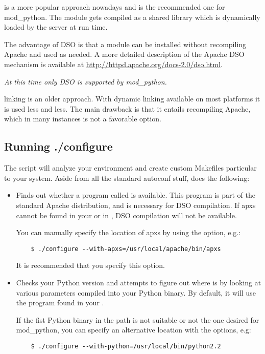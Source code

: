  is a more popular approach nowadays and is the recommended
one for mod_python. The module gets compiled as a shared library which
is dynamically loaded by the server at run time.

The advantage of DSO is that a module can be installed without
recompiling Apache and used as needed.  A more detailed description of
the Apache DSO mechanism is available at
\url{http://httpd.apache.org/docs-2.0/dso.html}.

\emph{At this time only DSO is supported by mod_python.}

 linking is an older approach. With dynamic linking
available on most platforms it is used less and less. The main
drawback is that it entails recompiling Apache, which in many
instances is not a favorable option.

\subsection{Running ./configure\label{inst-configure}}

The  script will analyze your environment and create custom
Makefiles particular to your system. Aside from all the standard
autoconf stuff,  does the following:

\begin{itemize}

\item
  Finds out whether a program called  is available. This
  program is part of the standard Apache distribution, and is necessary
  for DSO compilation. If apxs cannot be found in your  or in
  , DSO compilation will not be available.

  You can manually specify the location of apxs by using the
   option, e.g.:

  \begin{verbatim}
    $ ./configure --with-apxs=/usr/local/apache/bin/apxs 	
  \end{verbatim}

  It is recommended that you specify this option.

\item
  Checks your Python version and attempts to figure out where
   is by looking at various parameters compiled into
  your Python binary. By default, it will use the 
  program found in your .

   If the fist Python
  binary in the path is not suitable or not the one desired for
  mod_python, you can specify an alternative location with the
   options, e.g:

  \begin{verbatim}
    $ ./configure --with-python=/usr/local/bin/python2.2
  \end{verbatim}                      

\end{itemize}

